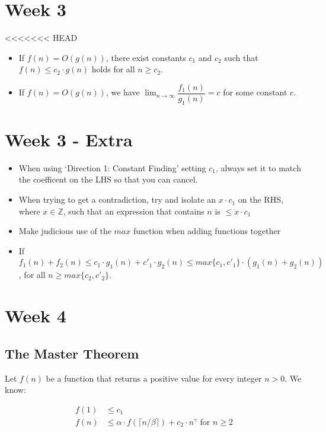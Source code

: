 \documentclass[5pt,a4paper]{article}
\begin{document}
\begin{multicols}{3}

\section{Week 3}

<<<<<<< HEAD
\begin{itemize}
\item If $f(n) = O(g(n))$, there exist constants $c_1$ and $c_2$ such that $f(n) \leqslant c_2 \cdot g(n)$ holds for all $n \geqslant c_2$.
\item If $f(n) = O(g(n))$, we have $\lim_{n \to \infty} \dfrac{f_1(n)}{g_1(n)} = c$ for some constant $c$. 
\end{itemize}

\section{Week 3 - Extra}

\begin{itemize}
\item When using `Direction 1: Constant Finding' setting $c_1$, always set it to match the coefficent on the LHS so that you can cancel.
\item When trying to get a contradiction, try and isolate an $x \cdot c_1$ on the RHS, where $x \in \mathbb{Z}$, such that an expression that contains $n$ is $\leqslant x \cdot c_1$
\item Make judicious use of the $max$ function when adding functions together
\item If $f_1(n) + f_2(n) \leqslant c_1 \cdot g_1(n) +c'_1 \cdot g_2(n) \leqslant max\{c_1 , c'_1 \} \cdot (g_1(n) + g_2(n))$, for all $n \geqslant max\{c_2, c'_2\}$.
\end{itemize}

\section{Week 4}
\subsection{The Master Theorem}

Let $f(n)$ be a function that returns a positive value for every integer $n>0$. We know:

\begin{align*}
f(1) & \leqslant c_1\\
f(n) & \leqslant \alpha \cdot f(\lceil n / \beta \rceil) + c_2 \cdot n^{\gamma} \text{ for } n \geqslant 2
\end{align*}


\end{multicols}
\end{document}
